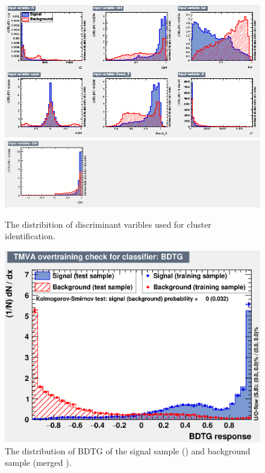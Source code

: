 \begin{figure}[!htb]
  \begin{center}
    \includegraphics[width=0.99\linewidth]{Figures/06_ECAL/fast_sim/Identification/gamma_piz/with_time/variables_id_c1.png} \\
    \includegraphics[width=0.97\linewidth]{Figures/06_ECAL/fast_sim/Identification/gamma_piz/with_time/new_variables_id_c2.png}
    \vspace*{-0.5cm}
  \end{center}
  \caption{
   The distribition of discriminant varibles used for cluster identification.
  }
  \label{fig:identi_gamma_piz_var}
\end{figure}

\begin{figure}[!htb]
  \begin{center}
    \includegraphics[width=0.49\linewidth]{Figures/06_ECAL/fast_sim/Identification/gamma_piz/with_time/overtrain_BDTG.eps} 
    \vspace*{-0.5cm}
  \end{center}
  \caption{
     The distribution of BDTG of the signal sample (\g) and background sample (merged \piz).
  }
  \label{fig:identi_gamma_piz_overtrain}
\end{figure}

